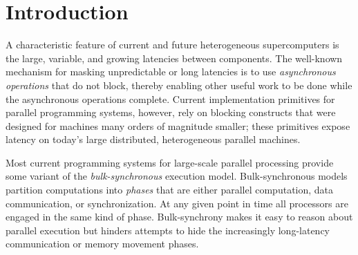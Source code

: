 
\section{Introduction}
\label{sec:intro}





A characteristic feature of current and future heterogeneous
supercomputers is the large, variable, and growing latencies between
components.  The well-known mechanism for masking unpredictable or
long latencies is to use {\em asynchronous operations} that do not block,
thereby enabling other useful work to be done while the asynchronous
operations complete. Current implementation primitives for parallel
programming systems, however, rely on blocking constructs that were
designed for machines many orders of magnitude
smaller\cite{MPI,COARRAY_FORTRAN,UPC99}; these primitives expose
latency on today's large distributed, heterogeneous parallel machines.


Most current programming systems for large-scale parallel processing provide some variant
of the {\em bulk-synchronous} execution model\cite{Valiant90}.  Bulk-synchronous models
partition computations into {\em phases} that are either parallel computation, data
communication, or synchronization.  At any given point in time all processors
are engaged in the same kind of phase.  Bulk-synchrony
makes it easy to reason about parallel execution but
hinders attempts to hide the increasingly long-latency communication
or memory movement phases.  

